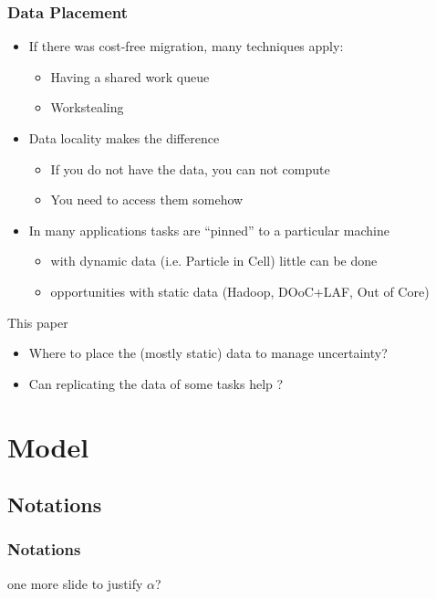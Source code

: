 \documentclass[usenames,dvipsnames]{beamer}
\begin{document}
\begin{frame}
  \frametitle{Data Placement}
  
  \begin{itemize}
  \item If there was cost-free migration, many techniques apply:
    \begin{itemize}
    \item Having a shared work queue
    \item Workstealing
    \end{itemize}
  \item Data locality makes the difference
    \begin{itemize}
      \item If you do not have the data, you can not compute
      \item You need to access them somehow
    \end{itemize}
  \item In many applications tasks are ``pinned'' to a particular machine
    \begin{itemize}
    \item with dynamic data (i.e. Particle in Cell) little can be done
    \item opportunities with static data (Hadoop, DOoC+LAF, Out of Core)
    \end{itemize}
  \end{itemize}

  \pause
  
  \begin{block}{This paper}
    \begin{itemize}
    \item Where to place the (mostly static) data to manage uncertainty?
    \item Can replicating the data of some tasks help ?
    \end{itemize}
  \end{block}
\end{frame}

\section{Model}

\subsection{Notations}

\begin{frame}
  \frametitle{Notations}


  one more slide to justify $\alpha$?
\end{frame}
\end{document}

